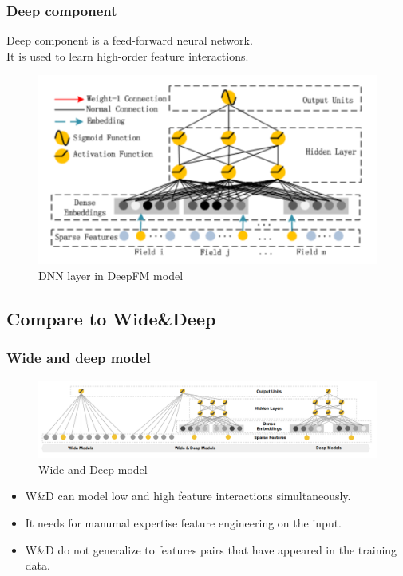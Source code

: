 \documentclass{beamer}
\begin{document}
\begin{frame}
	\frametitle{Deep component}
	Deep component is a feed-forward neural network. \\
	It is used to learn high-order feature interactions. \\
	\begin{figure}
		\includegraphics[scale=0.25]{deep}
		\caption{DNN layer in DeepFM model}
	\end{figure}
	
\end{frame}

\subsection{Compare to Wide\&Deep}
\begin{frame}
	\frametitle{Wide and deep model}
	\begin{figure}
		\includegraphics[scale=0.22]{wnd}
		\caption{Wide and Deep model}
	\end{figure}
	
	\begin{itemize}
		\item W\&D can model low and high feature interactions simultaneously. 
		\item It needs for manumal expertise feature engineering on the input. 
		\item W\&D do not generalize to features pairs that have appeared in the training data. 
	\end{itemize}
\end{frame}
\end{document}
